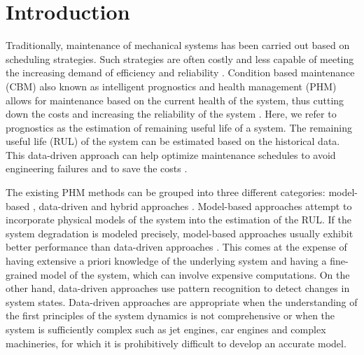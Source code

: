 \documentclass[preprint,12pt]{elsarticle}%
\begin{document}
%



\section{Introduction}

\label{sec:rul_intro}

Traditionally, maintenance of mechanical systems has been carried out based on
scheduling strategies. Such strategies are often costly and less capable of
meeting the increasing demand of efficiency and reliability
\cite{Gebraeel2005, Zaidan2013}. Condition based maintenance (CBM) also known
as intelligent prognostics and health management (PHM) allows for maintenance
based on the current health of the system, thus cutting down the costs and increasing
the reliability of the system \cite{Zhao2017}. Here, we refer to prognostics
as the estimation of remaining useful life of a system. The remaining useful life (RUL) of
the system can be estimated based on the historical data. This data-driven
approach can help optimize maintenance schedules to avoid engineering failures
and to save the costs \cite{Lee2014}.

The existing PHM methods can be grouped into three different categories:
model-based \cite{Yu2001}, data-driven \cite{Liu2009, Mosallam2013} and
hybrid approaches \cite{Pecht2010, Liu2012}. Model-based approaches attempt to
incorporate physical models of the system into the estimation of the RUL. If
the system degradation is modeled precisely, model-based approaches usually
exhibit better performance than data-driven approaches \cite{Qian2017}. This
comes at the expense of having extensive a priori knowledge of the underlying
system and having a fine-grained model of the system, which can involve
expensive computations. On the other hand, data-driven approaches use pattern
recognition to detect changes in system states. Data-driven approaches are
appropriate when the understanding of the first principles of the system
dynamics is not comprehensive or when the system is sufficiently complex such as
jet engines, car engines and complex machineries, for which it is prohibitively difficult 
to develop an accurate model.
\end{document}
